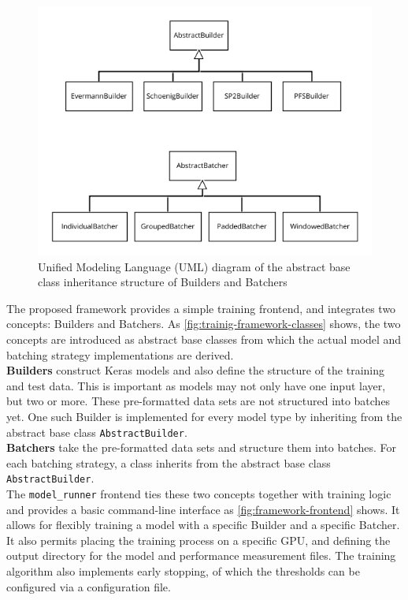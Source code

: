 \begin{figure}
    \centering
    \includegraphics[width=\textwidth]{gfx/training-framework-classes.png}
    \caption[UML diagram of the framework classes]{Unified Modeling Language (UML) diagram of the abstract base class inheritance structure of Builders and Batchers}
    \label{fig:trainig-framework-classes}
\end{figure}

The proposed framework provides a simple training frontend, and integrates two concepts: Builders and Batchers. As \autoref{fig:trainig-framework-classes} shows, the two concepts are introduced as abstract base classes from which the actual model and batching strategy implementations are derived.\\

\noindent\textbf{Builders} construct Keras models and also define the structure of the training and test data. This is important as models may not only have one input layer, but two or more. These pre-formatted data sets are not structured into batches yet. One such Builder is implemented for every model type by inheriting from the abstract base class \verb=AbstractBuilder=.\\

\noindent\textbf{Batchers} take the pre-formatted data sets and structure them into batches. For each batching strategy, a class inherits from the abstract base class \verb=AbstractBuilder=.\\

\noindent The \verb=model_runner= frontend ties these two concepts together with training logic and provides a basic command-line interface as \autoref{fig:framework-frontend} shows. It allows for flexibly training a model with a specific Builder and a specific Batcher. It also permits placing the training process on a specific GPU, and defining the output directory for the model and performance measurement files. The training algorithm also implements early stopping, of which the thresholds can be configured via a configuration file.\\

